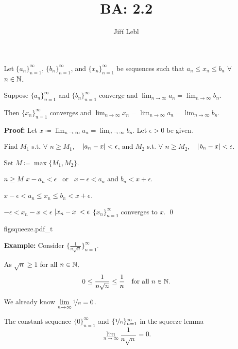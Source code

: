 \documentclass[10pt,aspectratio=149]{beamer}
\author{Ji\v{r}\'i Lebl}
\institute[OSU]{%
Departemento pri Matematiko de Oklahoma {\^S}tata Universitato}
\title{BA: 2.2}
\date{}
\begin{document}
\begin{frame}
\titlepage
\end{frame}

\begin{frame}
\begin{lemma}
Let $\{ a_n \}_{n=1}^\infty$, 
$\{ b_n \}_{n=1}^\infty$, and 
$\{ x_n \}_{n=1}^\infty$ be sequences such that
\quad
$a_n \leq x_n \leq b_n$ \quad $\forall$ $n \in {\mathbb{N}}$.
\pause

Suppose $\{ a_n \}_{n=1}^\infty$ and $\{ b_n \}_{n=1}^\infty$ converge and
\quad
$\displaystyle
\lim_{n\to \infty} a_n
=
\lim_{n\to \infty} b_n$.

\pause
Then $\{ x_n \}_{n=1}^\infty$ converges and
\quad
$\displaystyle
\lim_{n\to \infty} x_n
=
\lim_{n\to \infty} a_n
=
\lim_{n\to \infty} b_n$.
\end{lemma}

\pause
\textbf{Proof:}
Let $\displaystyle x \coloneqq \lim_{n\to\infty} a_n = \lim_{n\to\infty} b_n$.
\pause
Let $\epsilon > 0$ be given.

\pause
Find $M_1$ s.t. $\forall$ $n \geq M_1$, ~
$\left\lvert {a_n-x} \right\rvert < \epsilon$,
\pause
and $M_2$  s.t. $\forall$ $n \geq M_2$,
~ $\left\lvert {b_n-x} \right\rvert < \epsilon$.

\pause
Set $M \coloneqq \max \{M_1, M_2 \}$.

\pause
$n \geq M$
\wthus
$x - a_n < \epsilon$ ~or~ $x - \epsilon < a_n$ \quad
\pause
 and \quad  $b_n < x + \epsilon$.

\pause
\thus \quad
$x - \epsilon < a_n \leq x_n \leq b_n < x + \epsilon$.

\pause
\thus \quad $-\epsilon < x_n-x < \epsilon$
\pause
\wthus $\left\lvert {x_n-x} \right\rvert < \epsilon$
\pause
\wthus
$\{x_n\}_{n=1}^\infty$ converges to $x$.
\qed

\pause
\medskip

{figsqueeze.pdf_t}

\end{frame}

\begin{frame}

\textbf{Example:}
Consider $\bigl\{ \frac{1}{n\sqrt{n}} \bigr\}_{n=1}^\infty$.

\pause
\medskip

As $\sqrt{n} \geq 1$ for all $n \in {\mathbb{N}}$,
\begin{equation*}
0 \leq \frac{1}{n\sqrt{n}} \leq \frac{1}{n}
\quad \text{for all } n \in {\mathbb{N}}.
\end{equation*}

\pause

We already know $\displaystyle \lim_{n \to \infty} \nicefrac{1}{n} = 0$. 

\medskip
\pause

The constant sequence $\{ 0 \}_{n=1}^\infty$ and $\{ \nicefrac{1}{n}
\}_{n=1}^\infty$ in the
squeeze lemma \quad \thus
\begin{equation*}
\lim_{n\to\infty} \frac{1}{n\sqrt{n}} = 0 .
\end{equation*}

\end{frame}
\end{document}
